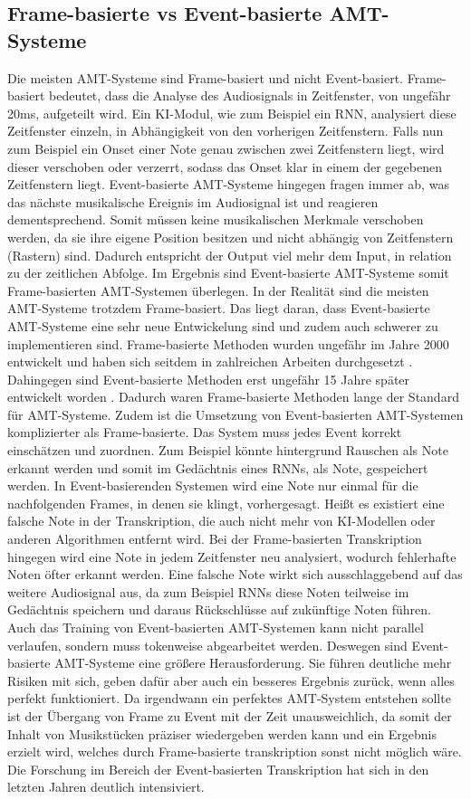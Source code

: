 \subsection{Frame-basierte vs Event-basierte AMT-Systeme}
Die meisten AMT-Systeme sind Frame-basiert und nicht Event-basiert.
Frame-basiert bedeutet, dass die Analyse des Audiosignals in Zeitfenster, von ungefähr 20ms, aufgeteilt wird.
Ein KI-Modul, wie zum Beispiel ein RNN, analysiert diese Zeitfenster einzeln,
in Abhängigkeit von den vorherigen Zeitfenstern.
Falls nun zum Beispiel ein Onset einer Note genau zwischen zwei Zeitfenstern liegt,
wird dieser verschoben oder verzerrt, sodass das Onset klar in einem der gegebenen Zeitfenstern liegt.
Event-basierte AMT-Systeme hingegen fragen immer ab,
was das nächste musikalische Ereignis im Audiosignal ist und reagieren dementsprechend.
Somit müssen keine musikalischen Merkmale verschoben werden,
da sie ihre eigene Position besitzen und nicht abhängig von Zeitfenstern (Rastern) sind.
Dadurch entspricht der Output viel mehr dem Input, in relation zu der zeitlichen Abfolge.
Im Ergebnis sind Event-basierte AMT-Systeme somit Frame-basierten AMT-Systemen überlegen.
In der Realität sind die meisten AMT-Systeme trotzdem Frame-basiert.
Das liegt daran, dass Event-basierte AMT-Systeme eine sehr neue Entwickelung sind
und zudem auch schwerer zu implementieren sind.
Frame-basierte Methoden wurden ungefähr im Jahre 2000 entwickelt
und haben sich seitdem in zahlreichen Arbeiten durchgesetzt \cite{Martin1996, klapuri1998automatic}.
Dahingegen sind Event-basierte Methoden erst ungefähr 15 Jahre später entwickelt worden \cite{performance_rnn2017event}.
Dadurch waren Frame-basierte Methoden lange der Standard für AMT-Systeme.
Zudem ist die Umsetzung von Event-basierten AMT-Systemen komplizierter als Frame-basierte.
Das System muss jedes Event korrekt einschätzen und zuordnen.
Zum Beispiel könnte hintergrund Rauschen als Note erkannt werden und somit im
Gedächtnis eines RNNs, als Note, gespeichert werden.
In Event-basierenden Systemen wird eine Note nur einmal für die nachfolgenden Frames, in denen sie klingt, vorhergesagt.
Heißt es existiert eine falsche Note in der Transkription,
die auch nicht mehr von KI-Modellen oder anderen Algorithmen entfernt wird.
Bei der Frame-basierten Transkription hingegen wird eine Note in jedem Zeitfenster neu analysiert,
wodurch fehlerhafte Noten öfter erkannt werden.
Eine falsche Note wirkt sich ausschlaggebend auf das weitere Audiosignal aus,
da zum Beispiel RNNs diese Noten teilweise im Gedächtnis speichern und daraus Rückschlüsse auf zukünftige Noten führen.
Auch das Training von Event-basierten AMT-Systemen kann nicht parallel verlaufen,
sondern muss tokenweise abgearbeitet werden.
Deswegen sind Event-basierte AMT-Systeme eine größere Herausforderung.
Sie führen deutliche mehr Risiken mit sich, geben dafür aber auch ein besseres Ergebnis zurück, wenn alles perfekt funktioniert.
Da irgendwann ein perfektes AMT-System entstehen sollte ist der Übergang von
Frame zu Event mit der Zeit unausweichlich, da somit der Inhalt von Musikstücken
präziser wiedergeben werden kann und ein Ergebnis erzielt wird,
welches durch Frame-basierte transkription sonst nicht möglich wäre.
Die Forschung im Bereich der Event-basierten Transkription hat sich in den letzten Jahren deutlich intensiviert.

